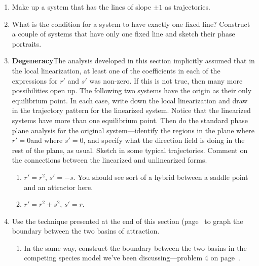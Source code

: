 \begin{enumerate}
  \begin{enumerate}
  \item In exercises 1, 3, and 4 in the previous section you found local
linearizations at the equilibrium points of a number of examples
discussed earlier.  Determine which of these have straight-line
trajectories and which do not.  For those that do, find the equations
of the lines and determine for each line whether the flow is towards
the origin or away from it.

  \item What is the general condition for a linear dynamical system to
have straight-line trajectories?


\end{enumerate}
\item Make up a system that has the lines of slope $\pm 1$ as
trajectories.


\item What is the condition for a system to have exactly one fixed
line?  Construct a couple of systems that have only one fixed line and
sketch their phase portraits.


\item {\bf Degeneracy}\quad The analysis developed in this section
implicitly assumed that in the local linearization, at least one of
the coefficients in each of the expressions for $r'$ and $s'$ was
non-zero.  If this is not true, then many more possibilities open up.
The following two systems have the origin as their only equilibrium
point.  In each case, write down the local linearization and draw in
the trajectory pattern for the linearized system.  Notice that the
linearized systems have more than one equilibrium point.  Then do the
standard phase plane analysis for the original system---identify the
regions in the plane where $r'=0$and where $s'=0$, and specify what
the direction field is doing in the rest of the plane, as usual.
Sketch in some typical trajectories.  Comment on the connections
between the linearized and unlinearized forms.

  \begin{enumerate}
  \item $r' = r^2$, \hspace{.25in} $s' = -s$.  You should see sort of a
hybrid between a saddle point and an attractor here.

  \item $r' = r^2+s^2$, \hspace{.25in} $s' = r$.



\end{enumerate}
\item Use the technique presented at the end of this section
(page~\pageref{`boundary'} to graph the boundary between the two
basins of attraction.

  \begin{enumerate}
  \item In the same way, construct the boundary between the two basins in
the competing species model we've been discussing---problem 4 on
page~\pageref{`basins'}.

\end{enumerate}
\end{enumerate}
